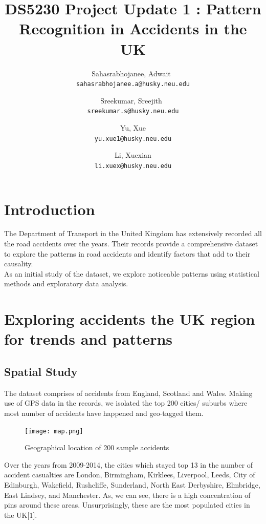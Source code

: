\documentclass[a4paper, 10pt]{article}
\begin{document}
\title{DS5230 Project Update 1 : Pattern Recognition in Accidents in the UK}


\author{
  Sahasrabhojanee, Adwait\ \\     \texttt{sahasrabhojanee.a@husky.neu.edu}
  \and
  Sreekumar, Sreejith\  \\ \texttt{sreekumar.s@husky.neu.edu}
  \and
  Yu, Xue \\  \texttt{yu.xue1@husky.neu.edu}
  \and
  Li, Xuexian  \\ \texttt{li.xuex@husky.neu.edu}
}
\maketitle
\section{Introduction}
The Department of Transport in the United Kingdom has extensively recorded all the road accidents over the years. Their records provide a comprehensive dataset to
explore the patterns in road accidents and identify factors that add to their causality. \\
  As an initial study of the dataset, we explore noticeable patterns using statistical methods and exploratory data analysis. 

\section{Exploring accidents the UK region for trends and patterns }

\subsection{Spatial Study}  
The dataset comprises of accidents from England, Scotland and Wales. Making use of GPS data in the records, we isolated the top 200 cities/ suburbs where most number of
accidents have happened and geo-tagged them. \\

\begin{figure}[H]
    \begin{center}
      \texttt{[image: map.png]}
      \caption{Geographical location of 200 sample accidents}
    \end{center}
\end{figure}

    Over the years from 2009-2014, the cities which stayed top 13 in the number of accident casualties are London, Birmingham, Kirklees, Liverpool, Leeds, City of Edinburgh, Wakefield, Rushcliffe, Sunderland, North East Derbyshire, Elmbridge, East Lindsey, and Manchester. As, we can see, there is a high concentration of pins around these areas. Unsurprisingly, these are the most populated cities in the UK[1]. \\
\end{document}
